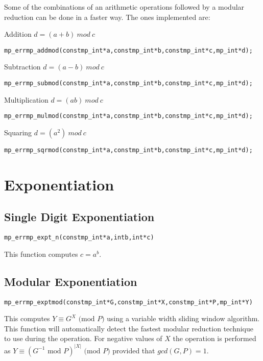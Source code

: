 \documentclass[synpaper]{book}
\def\mod{{\mathit\ mod\ }}
\begin{document}
Some of the combinations of an arithmetic operations followed by a modular reduction can be done in
a faster way. The ones implemented are:

Addition $d = (a + b) \mod c$

\begin{alltt}
mp_err mp_addmod(const mp_int *a, const mp_int *b, const mp_int *c, mp_int *d);
\end{alltt}

Subtraction  $d = (a - b) \mod c$

\begin{alltt}
mp_err mp_submod(const mp_int *a, const mp_int *b, const mp_int *c, mp_int *d);
\end{alltt}

Multiplication $d = (ab) \mod c$

\begin{alltt}
mp_err mp_mulmod(const mp_int *a, const mp_int *b, const mp_int *c, mp_int *d);
\end{alltt}

Squaring  $d = (a^2) \mod c$

\begin{alltt}
mp_err mp_sqrmod(const mp_int *a, const mp_int *b, const mp_int *c, mp_int *d);
\end{alltt}

\chapter{Exponentiation}
\section{Single Digit Exponentiation}
\begin{alltt}
mp_err mp_expt_n(const mp_int *a, int b, int *c)
\end{alltt}
This function computes $c = a^b$.

\section{Modular Exponentiation}
\begin{alltt}
mp_err mp_exptmod (const mp_int *G, const mp_int *X, const mp_int *P, mp_int *Y)
\end{alltt}
This computes $Y \equiv G^X \mbox{ (mod }P\mbox{)}$ using a variable width sliding window
algorithm.  This function will automatically detect the fastest modular reduction technique to use
during the operation. For negative values of $X$ the operation is performed as $Y \equiv (G^{-1}
  \mbox{ mod }P)^{\vert X \vert} \mbox{ (mod }P\mbox{)}$ provided that $gcd(G, P) = 1$.
\end{document}
